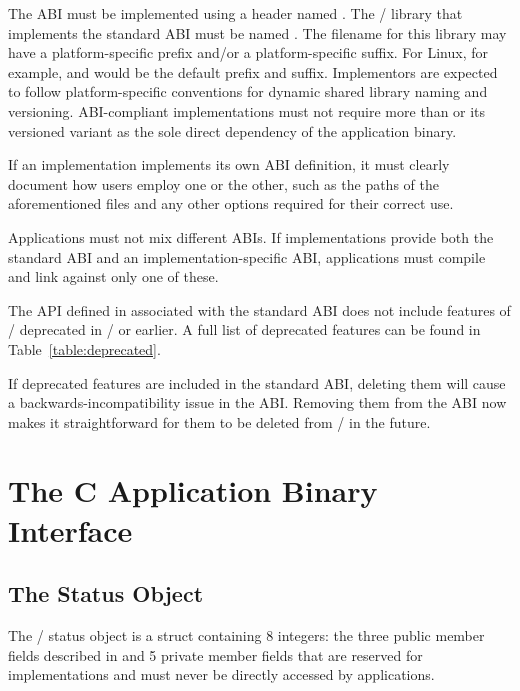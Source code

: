 The ABI must be implemented using a header named .
The \MPI/ library that implements the standard ABI must be
named .
The filename for this library may have a platform-specific
prefix and/or a platform-specific suffix. For Linux, for example,
 and  would be the default prefix and suffix.
Implementors are expected to follow platform-specific conventions
for dynamic shared library naming and versioning.
ABI-compliant implementations must not require more than 
or its versioned variant as the sole direct dependency of the application binary.

\begin{implementors}
If an implementation implements its own ABI definition,
it must clearly document how users employ one or the other,
such as the paths of the aforementioned files and any
other options required for their correct use.
\end{implementors}

Applications must not mix different ABIs. 
If implementations provide both the standard ABI and 
an implementation-specific ABI, applications must compile 
and link against only one of these.

The API defined in  associated with the standard ABI
does not include features of \MPI/ deprecated in \MPIIIIDOTI/ or earlier.
A full list of deprecated features can be found in Table~\ref{table:deprecated}.

\begin{rationale}
If deprecated features are included in the standard ABI, deleting
them will cause a backwards-incompatibility issue in the ABI.
Removing them from the ABI now makes it straightforward for them
to be deleted from \MPI/ in the future.
\end{rationale}

\section{The C Application Binary Interface}
\label{sec:c-abi}

\subsection{The Status Object}

The \MPI/ status object is a struct containing 8 integers: 
the three public member fields described in 
and 5 private member fields that are reserved for implementations and 
must never be directly accessed by applications.

